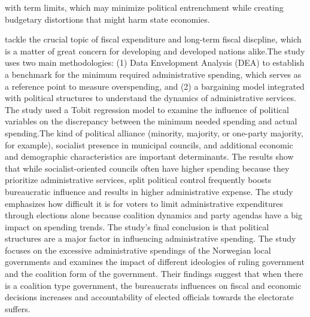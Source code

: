 with term limits, which may minimize political entrenchment while creating budgetary distortions that might harm state economies.\par
  tackle the crucial topic of fiscal expenditure and long-term fiscal discpline, which is a matter of great concern for developing and developed nations alike.The study uses two main methodologies: (1) Data Envelopment Analysis (DEA) to establish a benchmark for the minimum required administrative spending, which serves as a reference point to measure overspending, and (2) a bargaining model integrated with political structures to understand the dynamics of administrative services. The study used a Tobit regression model to examine the influence of political variables on the discrepancy between the minimum needed spending and actual spending.The kind of political alliance (minority, majority, or one-party majority, for example), socialist presence in municipal councils, and additional economic and demographic characteristics are important determinants. The results show that while socialist-oriented councils often have higher spending because they prioritize administrative services, split political control frequently boosts bureaucratic influence and results in higher administrative expense. The study emphasizes how difficult it is for voters to limit administrative expenditures through elections alone because coalition dynamics and party agendas have a big impact on spending trends. The study's final conclusion is that political structures are a major factor in influencing administrative spending. The study focuses on the excessive administrative spendings of the Norwegian local governments and examines the impact of different ideologies of ruling government and the coalition form of the government. Their findings suggest that when there is a coalition type government, the bureaucrats influences on fiscal and economic decisions increases and accountability of elected officials towards the electorate suffers.\par
